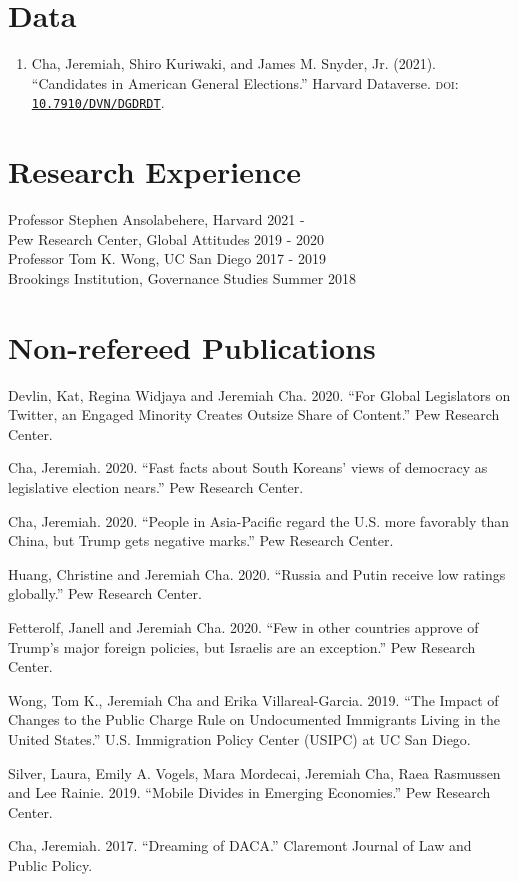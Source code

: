 \documentclass[margin, line]{res}
\begin{document}
\begin{resume}
\section{Data}
\begin{enumerate}
	\item Cha, Jeremiah, Shiro Kuriwaki, and James M. Snyder, Jr. (2021). ``Candidates in American General Elections.'' Harvard Dataverse. \textsc{doi}: \href{https://doi.org/10.7910/DVN/DGDRDT}{\texttt{10.7910/DVN/DGDRDT}}.
\end{enumerate}

\section{Research Experience}
Professor Stephen Ansolabehere, Harvard \hfill 2021 - \\
Pew Research Center, Global Attitudes \hfill 2019 - 2020\\
Professor Tom K. Wong, UC San Diego \hfill 2017 - 2019\\
Brookings Institution, Governance Studies \hfill Summer 2018

\section{Non-refereed Publications}

\begin{etaremune}
	\item Devlin, Kat, Regina Widjaya and Jeremiah Cha. 2020. ``For Global Legislators on Twitter, an Engaged Minority Creates Outsize Share of Content.'' Pew Research Center.
	\item Cha, Jeremiah. 2020. ``Fast facts about South Koreans’ views of democracy as legislative election nears.'' Pew Research Center.
	\item Cha, Jeremiah. 2020. ``People in Asia-Pacific regard the U.S. more favorably than China, but Trump gets negative marks.'' Pew Research Center.
	\item Huang, Christine and Jeremiah Cha. 2020. ``Russia and Putin receive low ratings globally.'' Pew Research Center.
	\item Fetterolf, Janell and Jeremiah Cha. 2020. ``Few in other countries approve of Trump’s major foreign policies, but Israelis are an exception.'' Pew Research Center.
	\item Wong, Tom K., Jeremiah Cha and Erika Villareal-Garcia. 2019. ``The Impact of Changes to the Public Charge Rule on Undocumented Immigrants Living in the United States.'' U.S. Immigration Policy Center (USIPC) at UC San Diego.
	\item Silver, Laura, Emily A. Vogels, Mara Mordecai, Jeremiah Cha, Raea Rasmussen and Lee Rainie. 2019. ``Mobile Divides in Emerging Economies.'' Pew Research Center.
	\item Cha, Jeremiah. 2017. ``Dreaming of DACA.'' Claremont Journal of Law and Public Policy.
\end{etaremune}



\end{resume}
\end{document}
